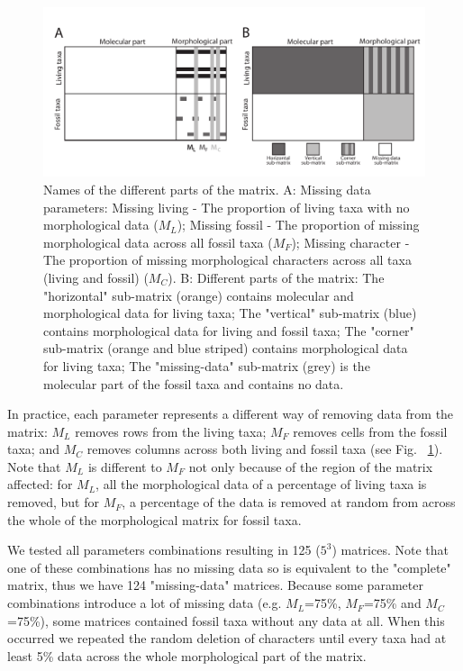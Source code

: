 \documentclass[12pt,letterpaper]{article}
\begin{document}
\begin{figure}
\centering
\includegraphics[keepaspectratio=true]{Figures/TEM_Fig_missingData-BW.pdf}
\caption{Names of the different parts of the matrix.
A: Missing data parameters:
Missing living - The proportion of living taxa with no morphological data ($M_{L}$);
Missing fossil - The proportion of missing morphological data across all fossil taxa ($M_{F}$);
Missing character - The proportion of missing morphological characters across all taxa (living and fossil) ($M_{C}$).
B: Different parts of the matrix:
The "horizontal" sub-matrix (orange) contains molecular and morphological data for living taxa;
The "vertical" sub-matrix (blue) contains morphological data for living and fossil taxa;
The "corner" sub-matrix (orange and blue striped) contains morphological data for living taxa;
The "missing-data" sub-matrix (grey) is the molecular part of the fossil taxa and contains no data.}
\label{Fig_RemoveData}
\end{figure}

In practice, each parameter represents a different way of removing data from the matrix: $M_{L}$ removes rows from the living taxa; $M_{F}$ removes cells from the fossil taxa; and $M_{C}$ removes columns across both living and fossil taxa (see Fig. ~\ref{Fig_RemoveData}).
Note that $M_{L}$ is different to $M_{F}$ not only because of the region of the matrix affected: for $M_{L}$, all the morphological data of a percentage of living taxa is removed, but for $M_{F}$, a percentage of the data is removed at random from across the whole of the morphological matrix for fossil taxa.

We tested all parameters combinations resulting in 125 ($5^3$) matrices.
Note that one of these combinations has no missing data so is equivalent to the "complete" matrix, thus we have 124 "missing-data" matrices.
Because some parameter combinations introduce a lot of missing data (e.g. $M_L$=75\%, $M_F$=75\% and $M_C$=75\%), some matrices contained fossil taxa without any data at all.
When this occurred we repeated the random deletion of characters until every taxa had at least 5\% data across the whole morphological part of the matrix.
\end{document}
